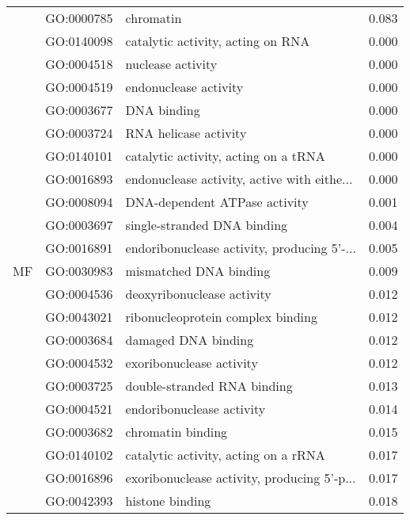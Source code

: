 \begin{longtable}{lllr}
   & GO:0000785 &                                    chromatin &         0.083 \\
\cline{1-4}
\multirow{37}{*}{MF} & GO:0140098 &            catalytic activity, acting on RNA &         0.000 \\
   & GO:0004518 &                            nuclease activity &         0.000 \\
   & GO:0004519 &                        endonuclease activity &         0.000 \\
   & GO:0003677 &                                  DNA binding &         0.000 \\
   & GO:0003724 &                        RNA helicase activity &         0.000 \\
   & GO:0140101 &         catalytic activity, acting on a tRNA &         0.000 \\
   & GO:0016893 &  endonuclease activity, active with eithe... &         0.000 \\
   & GO:0008094 &                DNA-dependent ATPase activity &         0.001 \\
   & GO:0003697 &                  single-stranded DNA binding &         0.004 \\
   & GO:0016891 &  endoribonuclease activity, producing 5'-... &         0.005 \\
   & GO:0030983 &                       mismatched DNA binding &         0.009 \\
   & GO:0004536 &                   deoxyribonuclease activity &         0.012 \\
   & GO:0043021 &            ribonucleoprotein complex binding &         0.012 \\
   & GO:0003684 &                          damaged DNA binding &         0.012 \\
   & GO:0004532 &                     exoribonuclease activity &         0.012 \\
   & GO:0003725 &                  double-stranded RNA binding &         0.013 \\
   & GO:0004521 &                    endoribonuclease activity &         0.014 \\
   & GO:0003682 &                            chromatin binding &         0.015 \\
   & GO:0140102 &         catalytic activity, acting on a rRNA &         0.017 \\
   & GO:0016896 &  exoribonuclease activity, producing 5'-p... &         0.017 \\
   & GO:0042393 &                              histone binding &         0.018 \\

\end{longtable}
